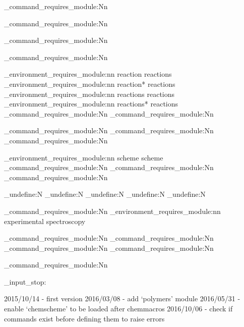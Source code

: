 \chemmacros_command_requires_module:Nn 

\chemmacros_command_requires_module:Nn 

\chemmacros_command_requires_module:Nn 

\chemmacros_command_requires_module:Nn 

\chemmacros_environment_requires_module:nn {reaction}       {reactions}
\chemmacros_environment_requires_module:nn {reaction*}      {reactions}
\chemmacros_environment_requires_module:nn {reactions}      {reactions}
\chemmacros_environment_requires_module:nn {reactions*}     {reactions}
\chemmacros_command_requires_module:Nn     
\chemmacros_command_requires_module:Nn     

\chemmacros_command_requires_module:Nn 
\chemmacros_command_requires_module:Nn 
\chemmacros_command_requires_module:Nn 

\chemmacros_environment_requires_module:nn {scheme}        {scheme}
\chemmacros_command_requires_module:Nn     
\chemmacros_command_requires_module:Nn     
\chemmacros_command_requires_module:Nn     

  {
    \cs_undefine:N \scheme
    \cs_undefine:N \endscheme
    \cs_undefine:N \listschemename
    \cs_undefine:N \schemename
    \cs_undefine:N \listofschemes
  }

\chemmacros_command_requires_module:Nn     
\chemmacros_environment_requires_module:nn {experimental} {spectroscopy}

\chemmacros_command_requires_module:Nn 
\chemmacros_command_requires_module:Nn 
\chemmacros_command_requires_module:Nn 
\chemmacros_command_requires_module:Nn 

\chemmacros_command_requires_module:Nn 


\file_input_stop:

2015/10/14 - first version
2016/03/08 - add `polymers' module
2016/05/31 - enable `chemscheme' to be loaded after chemmacros
2016/10/06 - check if commands exist before defining them to raise errors
